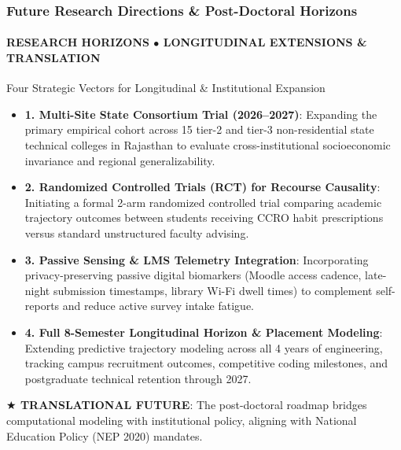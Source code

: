 \documentclass[aspectratio=169, 10pt]{beamer}
\newcommand{\leadbullet}[2]{\textbf{\color{NavyDark}#1}: \color{TextBody}#2}
\begin{document}
\begin{frame}
  \frametitle{Future Research Directions \& Post-Doctoral Horizons}
  \framesubtitle{RESEARCH HORIZONS $\bullet$ LONGITUDINAL EXTENSIONS \& TRANSLATION}

  \begin{defensecard}{Four Strategic Vectors for Longitudinal \& Institutional Expansion}
    \begin{itemize}\setlength{\itemsep}{2.5pt}\setlength{\parskip}{0pt}\fontsize{8.2pt}{10.2pt}\selectfont
      \item \leadbullet{1. Multi-Site State Consortium Trial (2026--2027)}{Expanding the primary empirical cohort across 15 tier-2 and tier-3 non-residential state technical colleges in Rajasthan to evaluate cross-institutional socioeconomic invariance and regional generalizability.}
      \item \leadbullet{2. Randomized Controlled Trials (RCT) for Recourse Causality}{Initiating a formal 2-arm randomized controlled trial comparing academic trajectory outcomes between students receiving CCRO habit prescriptions versus standard unstructured faculty advising.}
      \item \leadbullet{3. Passive Sensing \& LMS Telemetry Integration}{Incorporating privacy-preserving passive digital biomarkers (Moodle access cadence, late-night submission timestamps, library Wi-Fi dwell times) to complement self-reports and reduce active survey intake fatigue.}
      \item \leadbullet{4. Full 8-Semester Longitudinal Horizon \& Placement Modeling}{Extending predictive trajectory modeling across all 4 years of engineering, tracking campus recruitment outcomes, competitive coding milestones, and postgraduate technical retention through 2027.}
    \end{itemize}
  \end{defensecard}
  \vspace{-0.1cm}

  \begin{takeawaybanner}
    \textbf{\color{GoldPill}$\bigstar$ TRANSLATIONAL FUTURE}: The post-doctoral roadmap bridges computational modeling with institutional policy, aligning with National Education Policy (NEP 2020) mandates.
  \end{takeawaybanner}
\end{frame}
\end{document}
